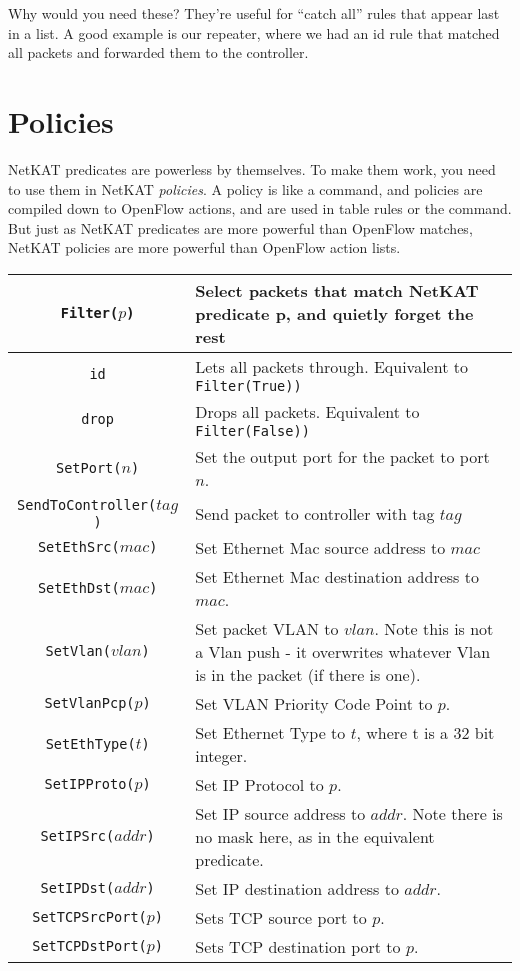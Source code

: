 Why would you need these?  
They're useful for ``catch all'' rules that appear last in a list.
A good example is our repeater, where we had an id rule that matched all packets and
forwarded them to the controller.

\section{Policies}

NetKAT predicates are powerless by themselves.  
To make them work, you need to use them in NetKAT \textit{policies}.
A policy is like a command, and policies are compiled down to OpenFlow actions, 
and are used in table rules or the  command.  
But just as NetKAT predicates are more powerful than OpenFlow matches, NetKAT policies are more
powerful than OpenFlow action lists.

\bigskip
\begin{tabularx}{\linewidth}{|c|X|}
\hline\hline
\texttt{Filter($p$)} & Select packets that match NetKAT predicate p, and quietly forget the rest  
\\ \hline
\texttt{id} & Lets all packets through.  Equivalent to \texttt{Filter(True))}  
\\ \hline
\texttt{drop} & Drops all packets.  Equivalent to \texttt{Filter(False))}  
\\ \hline
\texttt{SetPort($n$)} & Set the output port for the packet to port $n$.    
\\ \hline
\texttt{SendToController($tag$)} & Send packet to controller with tag $tag$    
\\ \hline
\texttt{SetEthSrc($mac$)} & Set Ethernet Mac source address to $mac$
\\ \hline
\texttt{SetEthDst($mac$)} & Set Ethernet Mac destination address to $mac$.
\\ \hline
\texttt{SetVlan($vlan$)} & Set packet VLAN to $vlan$.  Note this is not a Vlan push - it overwrites whatever 
Vlan is in the packet (if there is one).  
\\ \hline
\texttt{SetVlanPcp($p$)} & Set VLAN Priority Code Point to $p$.
\\ \hline
\texttt{SetEthType($t$)} & Set Ethernet Type to $t$, where t is a 32 bit integer.
\\ \hline
\texttt{SetIPProto($p$)} & Set IP Protocol to $p$.    
\\ \hline
\texttt{SetIPSrc($addr$)} & Set IP source address to $addr$.  Note there is no mask here, as in the equivalent predicate.  
\\ \hline
\texttt{SetIPDst($addr$)} & Set IP destination address to $addr$.  
\\ \hline
\texttt{SetTCPSrcPort($p$)} & Sets TCP source port to $p$.
\\ \hline
\texttt{SetTCPDstPort($p$)} & Sets TCP destination port to $p$.  
\\ \hline\hline
\end{tabularx}
\bigskip

